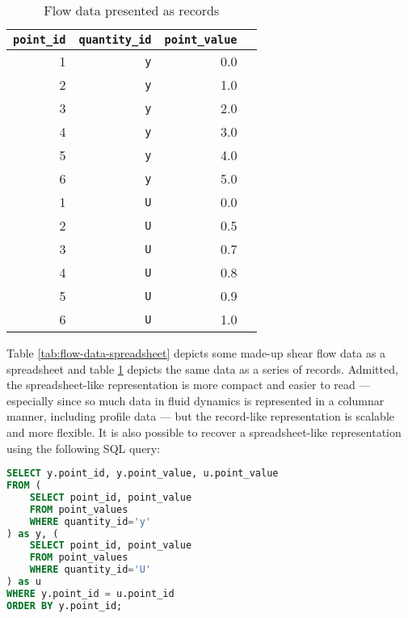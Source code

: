 \begin{table}[p]
    \centering
    \begin{tabular}{ r r | r r }
        \texttt{point\_id} & \texttt{quantity\_id} & \texttt{point\_value} \\
        \hline
                         1 & \texttt{y}            &                   0.0 \\
                         2 & \texttt{y}            &                   1.0 \\
                         3 & \texttt{y}            &                   2.0 \\
                         4 & \texttt{y}            &                   3.0 \\
                         5 & \texttt{y}            &                   4.0 \\
                         6 & \texttt{y}            &                   5.0 \\
                         1 & \texttt{U}            &                   0.0 \\
                         2 & \texttt{U}            &                   0.5 \\
                         3 & \texttt{U}            &                   0.7 \\
                         4 & \texttt{U}            &                   0.8 \\
                         5 & \texttt{U}            &                   0.9 \\
                         6 & \texttt{U}            &                   1.0
    \end{tabular}
    \caption{Flow data presented as records}
    \label{tab:flow-data-records}
\end{table}

Table \ref{tab:flow-data-spreadsheet} depicts some made-up shear flow data as a
spreadsheet and table \ref{tab:flow-data-records} depicts the same data as a
series of records.  Admitted, the spreadsheet-like representation is more
compact and easier to read --- especially since so much data in fluid dynamics
is represented in a columnar manner, including profile data --- but the
record-like representation is scalable and more flexible.  It is also possible
to recover a spreadsheet-like representation using the following SQL query:
%
\begin{lstlisting}[language=SQL]
SELECT y.point_id, y.point_value, u.point_value
FROM (
    SELECT point_id, point_value
    FROM point_values
    WHERE quantity_id='y'
) as y, (
    SELECT point_id, point_value
    FROM point_values
    WHERE quantity_id='U'
) as u
WHERE y.point_id = u.point_id
ORDER BY y.point_id;
\end{lstlisting}

